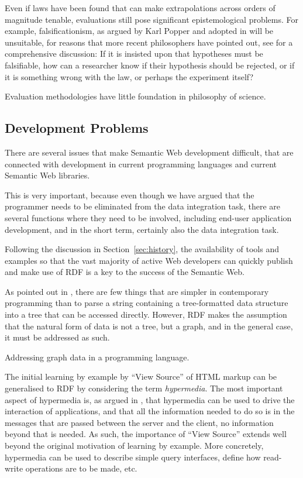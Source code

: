 Even if laws have been found that can make extrapolations across
orders of magnitude tenable, evaluations still pose significant
epistemological problems. For example, falsificationism, as argued by
Karl Popper and adopted in \cite{avinatguide} will be unsuitable, for
reasons that more recent philosophers have pointed out, see
\cite{chalmers1999whatis} for a comprehensive discussion: If it is
insisted upon that hypotheses must be falsifiable, how can a researcher
know if their hypothesis should be rejected, or if it is something
wrong with the law, or perhaps the experiment itself?


\begin{problem}\label{prob:badphil}
Evaluation methodologies have little foundation in philosophy of science.
\end{problem}


\subsection{Development Problems}\label{sec:devproblems}

There are several issues that make Semantic Web development difficult,
that are connected with development in current programming languages
and current Semantic Web libraries.

This is very important, because even though we have argued that the
programmer needs to be eliminated from the data integration task,
there are several functions where they need to be involved, including
end-user application development, and in the short term, certainly
also the data integration task. 

Following the discussion in Section~\ref{sec:history}, the
availability of tools and examples so that the vast majority of active
Web developers can quickly publish and make use of RDF is a key to the
success of the Semantic Web.

As pointed out in \cite{darobin1}, there are few things that are
simpler in contemporary programming than to parse a string containing
a tree-formatted data structure into a tree that can be accessed
directly. However, RDF makes the assumption that the natural form of
data is not a tree, but a graph, and in the general case, it must be
addressed as such.

\begin{problem}\label{prob:graph}
Addressing graph data in a programming language.
\end{problem}

The initial learning by example by ``View Source'' of HTML markup can
be generalised to RDF by considering the term \emph{hypermedia}. The
most important aspect of hypermedia is, as argued in
\cite{Fielding_2000_Architectural-Styles}, that hypermedia can be used
to drive the interaction of applications, and that all the information
needed to do so is in the messages that are passed between the server
and the client, no information beyond that is needed. As such, the
importance of ``View Source'' extends well beyond the original
motivation of learning by example. More concretely, hypermedia can be
used to describe simple query interfaces, define how read-write
operations are to be made, etc. 

